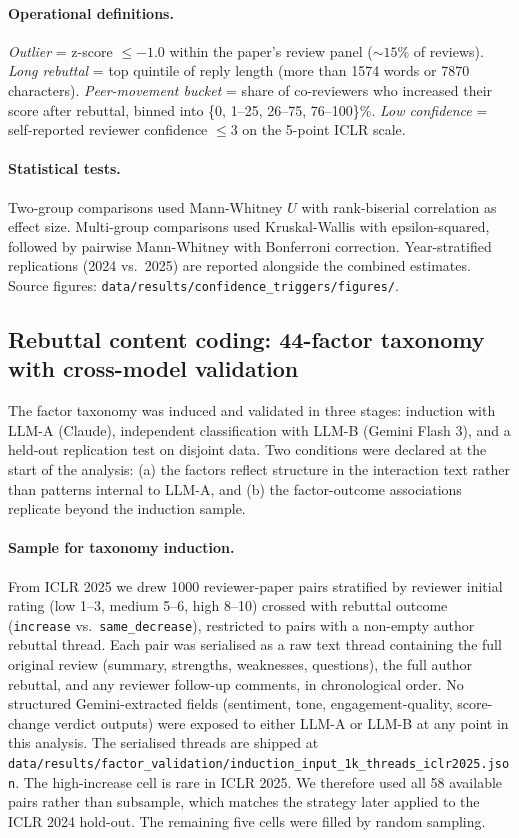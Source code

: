 \documentclass{article}
\newcommand{\code}[1]{\texttt{#1}}
\begin{document}
\paragraph{Operational definitions.}
\textit{Outlier} = z-score $\le -1.0$ within the paper's review panel (${\sim}15\%$ of reviews). \textit{Long rebuttal} = top quintile of reply length (more than \num{1574} words or \num{7870} characters). \textit{Peer-movement bucket} = share of co-reviewers who increased their score after rebuttal, binned into \{0, 1--25, 26--75, 76--100\}\%. \textit{Low confidence} = self-reported reviewer confidence $\le 3$ on the 5-point ICLR scale.

\paragraph{Statistical tests.}
Two-group comparisons used Mann-Whitney $U$ with rank-biserial correlation as effect size. Multi-group comparisons used Kruskal-Wallis with epsilon-squared, followed by pairwise Mann-Whitney with Bonferroni correction. Year-stratified replications (2024 vs.\ 2025) are reported alongside the combined estimates. Source figures: \code{data/results/confidence\_triggers/figures/}.

\subsection{Rebuttal content coding: 44-factor taxonomy with cross-model validation}\label{app:rebuttal-coding}

The factor taxonomy was induced and validated in three stages: induction with LLM-A (Claude), independent classification with LLM-B (Gemini Flash 3), and a held-out replication test on disjoint data. Two conditions were declared at the start of the analysis: (a) the factors reflect structure in the interaction text rather than patterns internal to LLM-A, and (b) the factor-outcome associations replicate beyond the induction sample.

\paragraph{Sample for taxonomy induction.}
From ICLR 2025 we drew \num{1000} reviewer-paper pairs stratified by reviewer initial rating (low 1--3, medium 5--6, high 8--10) crossed with rebuttal outcome (\code{increase} vs.\ \code{same\_decrease}), restricted to pairs with a non-empty author rebuttal thread. Each pair was serialised as a raw text thread containing the full original review (summary, strengths, weaknesses, questions), the full author rebuttal, and any reviewer follow-up comments, in chronological order. No structured Gemini-extracted fields (sentiment, tone, engagement-quality, score-change verdict outputs) were exposed to either LLM-A or LLM-B at any point in this analysis. The serialised threads are shipped at \code{data/results/factor\_validation/induction\_input\_1k\_threads\_iclr2025.json}. The high-increase cell is rare in ICLR 2025. We therefore used all 58 available pairs rather than subsample, which matches the strategy later applied to the ICLR 2024 hold-out. The remaining five cells were filled by random sampling.
\end{document}
